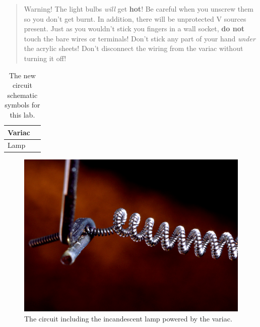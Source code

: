 \documentclass[12pt]{article}
\begin{document}
\begin{quote}
  Warning!  The light bulbs \textit{will} get \textbf{hot}!  Be
  careful when you unscrew them so you don't get burnt.  In addition,
  there will be unprotected \unit[120]{V} sources present.  Just as
  you wouldn't stick you fingers in a wall socket, \textbf{do not}
  touch the bare wires or terminals!  Don't stick any part of your
  hand \textit{under} the acrylic sheets!  Don't disconnect the wiring
  from the variac without turning it off!
\end{quote}

\begin{table}
  \centering
  \caption{The new circuit schematic symbols for this lab.}
  \begin{tabular}{|l|c|}\hline
    Variac & \\ \hline
    Lamp & \\ \hline
  \end{tabular}
  \label{tab:symbols}
\end{table}
\begin{figure}
  \centering
  \includegraphics[width=\textwidth/2]{figures/filament}
  \caption{The circuit including the incandescent lamp powered by the variac.}
  \label{fig:circuit}
\end{figure}
\end{document}
